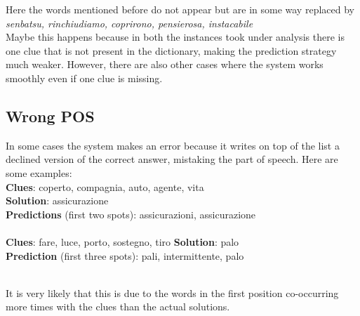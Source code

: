 \documentclass[twoside,twocolumn]{article}
\newenvironment{myfont}{\small\fontfamily{pag}\selectfont}{\par}
\begin{document}
	Here the words mentioned before do not appear but are in some way replaced by \textit{senbatsu, rinchiudiamo, coprirono, 	pensierosa, instacabile} \\
	Maybe this happens because in both the instances took under analysis there is one clue that is not present in the dictionary, making the prediction strategy much weaker. However, there are also other cases where the system works smoothly even if one clue is missing.

	\subsection{Wrong POS} 
	In some cases the system makes an error because it writes on top of the list a declined version of the correct answer, mistaking the part of speech. Here are some examples: \\
	\begin{myfont}
	\textbf{Clues}: coperto, compagnia, auto, agente, vita \\
	\textbf{Solution}: assicurazione \\
	\textbf{Predictions} (first two spots): assicurazioni, assicurazione \\ \\
	\textbf{Clues}: fare, luce, porto, sostegno, tiro
	\textbf{Solution}: palo \\
	\textbf{Prediction} (first three spots): pali, intermittente, palo \\ \\
	\end{myfont}
	It is very likely that this is due to the words in the first position co-occurring more times with the clues than the actual solutions.
	
\end{document}
